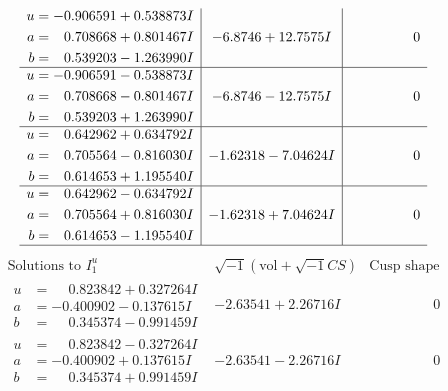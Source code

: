 \documentclass[1p]{elsarticle_modified}
\theoremstyle{definition}
\newcommand{\I}{\sqrt{-1}}
\begin{document}
$$\begin{array}{c|c|c}
\begin{aligned}
u &= -0.906591 + 0.538873 I \\
a &= \phantom{-}0.708668 + 0.801467 I \\
b &= \phantom{-}0.539203 - 1.263990 I\end{aligned}
 & -6.8746 + 12.7575 I & \phantom{-0.000000 } 0 \\ \hline\begin{aligned}
u &= -0.906591 - 0.538873 I \\
a &= \phantom{-}0.708668 - 0.801467 I \\
b &= \phantom{-}0.539203 + 1.263990 I\end{aligned}
 & -6.8746 - 12.7575 I & \phantom{-0.000000 } 0 \\ \hline\begin{aligned}
u &= \phantom{-}0.642962 + 0.634792 I \\
a &= \phantom{-}0.705564 - 0.816030 I \\
b &= \phantom{-}0.614653 + 1.195540 I\end{aligned}
 & -1.62318 - 7.04624 I & \phantom{-0.000000 } 0 \\ \hline\begin{aligned}
u &= \phantom{-}0.642962 - 0.634792 I \\
a &= \phantom{-}0.705564 + 0.816030 I \\
b &= \phantom{-}0.614653 - 1.195540 I\end{aligned}
 & -1.62318 + 7.04624 I & \phantom{-0.000000 } 0\\
 \hline 
 \end{array}$$\newpage$$\begin{array}{c|c|c}  
\text{Solutions to }I^u_{1}& \I (\text{vol} + \sqrt{-1}CS) & \text{Cusp shape}\\
 \hline 
\begin{aligned}
u &= \phantom{-}0.823842 + 0.327264 I \\
a &= -0.400902 - 0.137615 I \\
b &= \phantom{-}0.345374 - 0.991459 I\end{aligned}
 & -2.63541 + 2.26716 I & \phantom{-0.000000 } 0 \\ \hline\begin{aligned}
u &= \phantom{-}0.823842 - 0.327264 I \\
a &= -0.400902 + 0.137615 I \\
b &= \phantom{-}0.345374 + 0.991459 I\end{aligned}
 & -2.63541 - 2.26716 I & \phantom{-0.000000 } 0 \\ \hline\begin{aligned}

\end{aligned}
\end{array}$$
\end{document}
